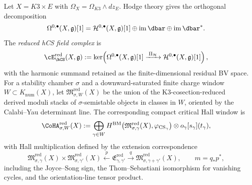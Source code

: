\begin{definition}
\label{def:k3e-reduced-hcs-compact-hall-window}
Let \(X=K3\times E\) with \(\Omega_X=\Omega_{K3}\wedge dz_E\).
Hodge theory gives the orthogonal decomposition
\[
 \Omega^{0,\bullet}(X,\mathfrak g)[1]
 =
 \mathcal H^{0,\bullet}(X,\mathfrak g)[1]
 \oplus
 \operatorname{im}\dbar
 \oplus
 \operatorname{im}\dbar^* .
\]
The \emph{reduced hCS field complex} is
\[
 \cE_{\hCS}^{\mathrm{red}}(X,\mathfrak g)
 :=
 \ker\!\left(
 \Omega^{0,\bullet}(X,\mathfrak g)[1]
 \xrightarrow{\;\Pi_{\mathcal H}\;}
 \mathcal H^{0,\bullet}(X,\mathfrak g)[1]
 \right),
\]
with the harmonic summand retained as the finite-dimensional residual
BV space.  For a stability chamber \(\sigma\) and a downward-saturated
finite charge window \(W\subset K_{\mathrm{num}}(X)\), let
\(\mathfrak M_{\sigma,W}^{\mathrm{red}}(X)\) be the union of the
K3-cosection-reduced derived moduli stacks of \(\sigma\)-semistable
objects in classes in \(W\), oriented by the Calabi--Yau determinant
line.  The corresponding compact critical Hall window is
\[
 \CoHA_{\sigma,W}^{\mathrm{red}}(X)
 :=
 \bigoplus_{\gamma\in W}
 H^{\mathrm{BM}}\!\left(
 \mathfrak M_{\sigma,\gamma}^{\mathrm{red}}(X),
 \varphi_{\mathrm{CS}_\gamma}
 \right)\otimes o_\gamma[s_\gamma](t_\gamma),
\]
with Hall multiplication defined by the extension correspondence
\[
 \mathfrak M_{\sigma,\gamma}^{\mathrm{red}}(X)
 \times
 \mathfrak M_{\sigma,\gamma'}^{\mathrm{red}}(X)
 \xleftarrow{\;p\;}
 \mathfrak E_{\gamma,\gamma'}^{\mathrm{red}}
 \xrightarrow{\;q\;}
 \mathfrak M_{\sigma,\gamma+\gamma'}^{\mathrm{red}}(X),
 \qquad
 m=q_*p^*,
\]
including the Joyce--Song sign, the Thom--Sebastiani isomorphism for
vanishing cycles, and the orientation-line tensor product.
\end{definition}

